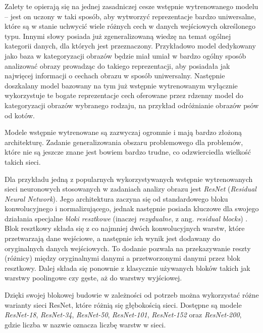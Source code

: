 Zalety te opierają się na jednej zasadniczej cesze wstępnie wytrenowanego modelu -- jest on uczony w taki sposób, aby wytworzyć reprezentacje bardzo uniwersalne, które są w stanie uchwycić wiele różnych cech w danych wejściowych określonego typu.
Innymi słowy posiada już zgeneralizowaną wiedzę na temat ogólnej kategorii danych, dla których jest przeznaczony.
Przykładowo model dedykowany jako baza w kategoryzacji obrazów będzie miał umiał w bardzo ogólny sposób analizować obrazy prowadząc do takiego reprezentacji, aby posiadała jak najwięcej informacji o cechach obrazu w sposób uniwersalny.
Następnie doszkalany model bazowany na tym już wstępnie wytrenowanym wyłącznie wykorzystuje te bogate reprezentacje cech oferowane przez rdzenny model do kategoryzacji obrazów wybranego rodzaju, na przykład odróżnianie obrazów psów od kotów.

Modele wstępnie wytrenowane są zazwyczaj ogromnie i mają bardzo złożoną architekturę.
Zadanie generalizowania obszaru problemowego dla problemów, które nie są jeszcze znane jest bowiem bardzo trudne, co odzwierciedla wielkość takich sieci.

Dla przykładu jedną z popularnych wykorzystywanych wstępnie wytrenowanych sieci neuronowych stosowanych w zadaniach analizy obrazu jest \emph{ResNet} (\emph{Residual Neural Network}).
Jego architektura zaczyna się od standardowego bloku konwolucyjnego i normalizującego, jednak następnie posiada kluczowe dla swojego działania specjalne \emph{bloki resztkowe} (inaczej \emph{rezydualne}, z ang. \emph{residual blocks}) \cite{li2016demystifying}.
Blok resztkowy składa się z co najmniej dwóch konwolucyjnych warstw, które przetwarzają dane wejściowe, a następnie ich wynik jest dodawany do oryginalnych danych wejściowych.
To dodanie pozwala na przekazywanie reszty (różnicy) między oryginalnymi danymi a przetworzonymi danymi przez blok resztkowy.
Dalej składa się ponownie z klasycznie używanych bloków takich jak warstwy poolingowe czy gęste, aż do warstwy wyjściowej.

Dzięki swojej blokowej budowie w zależności od potrzeb można wykorzystać różne warianty sieci ResNet, które różnią się głębokością sieci.
Dostępne są modele \emph{ResNet-18}, \emph{ResNet-34}, \emph{ResNet-50}, \emph{ResNet-101}, \emph{ResNet-152} oraz \emph{ResNet-200}, gdzie liczba w nazwie oznacza liczbę warstw w sieci.
